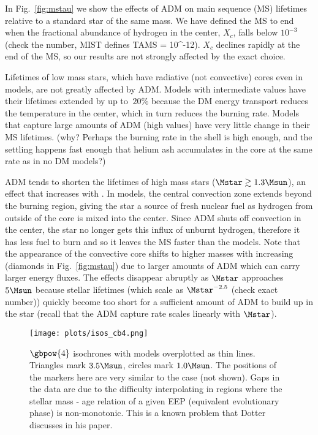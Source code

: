 In Fig.~\ref{fig:mstau} we show the effects of ADM on main sequence (MS) lifetimes relative to a standard \nodm star of the same mass. We have defined the MS to end when the fractional abundance of hydrogen in the center, $X_c$, falls below $10^{-3}$ (check the number, MIST defines TAMS = 10^-12). $X_c$ declines rapidly at the end of the MS, so our results are not strongly affected by the exact choice.

Lifetimes of low mass stars, which have radiative (not convective) cores even in \nodm models, are not greatly affected by ADM. Models with intermediate \gammaB values have their lifetimes extended by up to $~20\%$ because the DM energy transport reduces the temperature in the center, which in turn reduces the burning rate. Models that capture large amounts of ADM (high \gammaB values) have very little change in their MS lifetimes. (why? Perhaps the burning rate in the shell is high enough, and the settling happens fast enough that helium ash accumulates in the core at the same rate as in no DM models?)

ADM tends to shorten the lifetimes of high mass stars ($\Mstar \gtrsim 1.3 \Msun$), an effect that increases with \gammaB. In \nodm models, the central convection zone extends beyond the burning region, giving the star a source of fresh nuclear fuel as hydrogen from outside of the core is mixed into the center. Since ADM shuts off convection in the center, the star no longer gets this influx of unburnt hydrogen, therefore it has less fuel to burn and so it leaves the MS faster than the \nodm models. Note that the appearance of the convective core shifts to higher masses with increasing \gammaB (diamonds in Fig.~\ref{fig:mstau}) due to larger amounts of ADM which can carry larger energy fluxes. The effects disappear abruptly as $\Mstar$ approaches $5 \Msun$ because stellar lifetimes (which scale as $\Mstar^{-2.5}$ (check exact number)) quickly become too short for a sufficient amount of ADM to build up in the star (recall that the ADM capture rate scales linearly with $\Mstar$).


\begin{figure*}
  \centering
  \texttt{[image: plots/isos\_cb4.png]}
  \caption{$\gbpow{4}$ isochrones with \nodm models overplotted as thin lines. Triangles mark $3.5 \Msun$, circles mark $1.0 \Msun$. The positions of the markers here are very similar to the \nodm case (not shown). Gaps in the data are due to the difficulty interpolating in regions where the stellar mass - age relation of a given EEP (equivalent evolutionary phase) is non-monotonic. This is a known problem that Dotter discusses in his paper.
  }
  \label{fig:isos_cb4}
\end{figure*}

